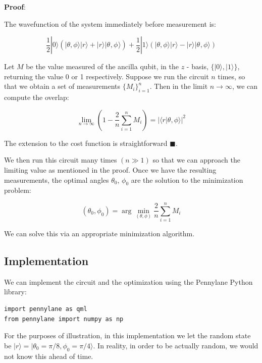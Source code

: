 \documentclass[11pt]{article}
\begin{document}
\textbf{\textbf{Proof}}:

The wavefunction of the system immediately before measurement is:


\[
\frac{1}{2}|0\rangle \left( |\theta,\phi \rangle|r\rangle + |r\rangle|\theta_{},\phi_{}\rangle \right) +
 \frac{1}{2}|1\rangle \left(|\theta,\phi\rangle|r\rangle - |r\rangle|\theta_{},\phi\rangle \right)
\]

Let \(M\) be the value measured of the ancilla qubit, in the \(z\) - basis, \(\{|0\rangle, |1\rangle \}\), returning the value 0 or 1 respectively. Suppose we run the circuit \(n\) times, so that we obtain a set of measurements \(\{ M_i \}_{i=1}^n\). Then in the limit \(n\to\infty\), we can compute the overlap:

\begin{equation*}
\lim_{n\to\infty } \left( 1 - \frac{2}{n}\sum_{i=1}^n M_i \right) = |\langle r | \theta, \phi \rangle|^2
\end{equation*}


The extension to the cost function is straightforward \(\blacksquare\).


We then run this circuit many times \((n \gg 1)\) so that we can approach the limiting value as mentioned in the proof. Once we have the resulting measurements, the optimal angles \(\theta_0\), \(\phi_0\) are the solution to the minimization problem:

\begin{equation*}
(\theta_{0}, \phi_{0}) = \arg\min_{(\theta, \phi)} \frac{2}{n}\sum_{i=1}^{n} M_i
\end{equation*}

We can solve this via an appropriate minimization algorithm.

\pagebreak

\subsection{Implementation}
\label{sec:org4ed7ace}


We can implement the circuit and the optimization using the Pennylane Python library:

\begin{verbatim}
import pennylane as qml
from pennylane import numpy as np
\end{verbatim}

For the purposes of illustration, in this implementation we let the random state be \(|r\rangle = |\theta_0=\pi/8, \phi_0=\pi/4 \rangle\). In reality, in order to be actually random, we would not know this ahead of time.
\end{document}
